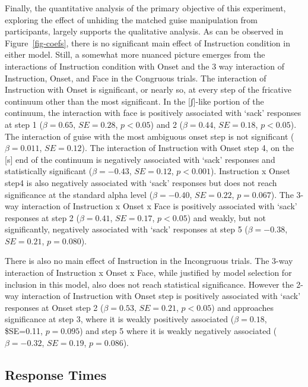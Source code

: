 \documentclass[
  letterpaper,
  DIV=11,
  numbers=noendperiod]{scrartcl}
\begin{document}
Finally, the quantitative analysis of the primary objective of this
experiment, exploring the effect of unhiding the matched guise
manipulation from participants, largely supports the qualitative
analysis. As can be observed in Figure~\ref{fig-coefs}, there is no
significant main effect of Instruction condition in either model. Still,
a somewhat more nuanced picture emerges from the interactions of
Instruction condition with Onset and the 3 way interaction of
Instruction, Onset, and Face in the Congruous trials. The interaction of
Instruction with Onset is significant, or nearly so, at every step of
the fricative continuum other than the most significant. In the
{[}ʃ{]}-like portion of the continuum, the interaction with face is
positively associated with `sack' responses at step 1 (\(β=0.65\),
\(SE=0.28\), \(p < 0.05\)) and 2 (\(β=0.44\), \(SE=0.18\),
\(p < 0.05\)). The interaction of guise with the most ambiguous onset
step is not significant (\(β=0.011\), \(SE=0.12\)). The interaction of
Instruction with Onset step 4, on the {[}s{]} end of the continuum is
negatively associated with `sack' responses and statistically
significant (\(β=-0.43\), \(SE=0.12\), \(p < 0.001\)). Instruction x
Onset step4 is also negatively associated with `sack' responses but does
not reach significance at the standard alpha level (\(β=-0.40\),
\(SE=0.22\), \(p = 0.067\)). The 3-way interaction of Instruction x
Onset x Face is positively associated with `sack' responses at step 2
(\(β=0.41\), \(SE=0.17\), \(p < 0.05\)) and weakly, but not
significantly, negatively associated with `sack' responses at step 5
(\(β=-0.38\), \(SE=0.21\), \(p = 0.080\)).

There is also no main effect of Instruction in the Incongruous trials.
The 3-way interaction of Instruction x Onset x Face, while justified by
model selection for inclusion in this model, also does not reach
statistical significance. However the 2-way interaction of Instruction
with Onset step is positively associated with `sack' responses at Onset
step 2 (\(β=0.53\), \(SE=0.21\), \(p < 0.05\)) and approaches
significance at step 3, where it is weakly positively associated
(\(β=0.18\), \$SE=0.11, \(p = 0.095\)) and step 5 where it is weakly
negatively associated (\(β=-0.32\), \(SE=0.19\), \(p = 0.086\)).

\subsection{Response Times}\label{response-times}
\end{document}
